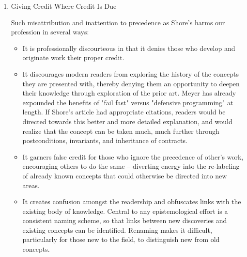 \documentclass{article}
\begin{document}
\begin{enumerate}
\begin{quote}
How can one check a large routine in the sense that it's right? In
order that the man who checks may not have too difficult a task, the
programmer should make a number of definite assertions which can be
checked individually, and from which the correctness of the whole
program easily follows. \footnote{\emph{Checking A Large Routine}, Talk delivered by Alan Turing,
Cambridge, 24 June 1950.}
\end{quote}

In contrast to Shore, Meyer is generous in his acknowledgement of
predecessors and contributors to DBC itself. Section 11.1 of his text
has an entire page of "Bibliographical Notes" in which he acknowledges
the work of Turing, Floyd, Hoare, Dijkstra, Mills and many others.
Indeed, he has delivered an entire presentation on the conceptual
history of DBC prior to his own involvement. \footnote{\emph{Eiffel's Design by Contract: Predecessors and Original
Contributions}, Bertrand Meyer}

\item Giving Credit Where Credit Is Due
\label{sec:orgheadline413}

Such misattribution and inattention to precedence as Shore's harms our
profession in several ways:

\begin{itemize}
\item It is professionally discourteous in that it denies those who develop
and originate work their proper credit.\\
\item It discourages modern readers from exploring the history of the
concepts they are presented with, thereby denying them an opportunity
to deepen their knowledge through exploration of the prior art. Meyer
has already expounded the benefits of "fail fast" versus "defensive
programming" at length. If Shore's article had appropriate citations,
readers would be directed towards this better and more detailed
explanation, and would realize that the concept can be taken much,
much further through postconditions, invariants, and inheritance of
contracts.\\
\item It garners false credit for those who ignore the precedence of
other's work, encouraging others to do the same -- diverting energy
into the re-labeling of already known concepts that could otherwise
be directed into new areas.\\
\item It creates confusion amongst the readership and obfuscates links with
the existing body of knowledge. Central to any epistemological effort
is a consistent naming scheme, so that links between new discoveries
and existing concepts can be identified. Renaming makes it difficult,
particularly for those new to the field, to distinguish new from old
concepts.
\end{itemize}


\end{enumerate}
\end{document}
